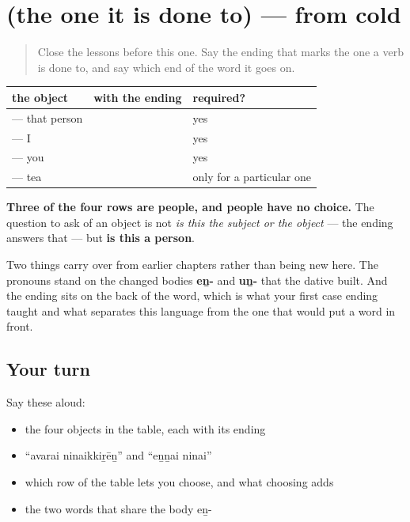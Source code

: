 \section[(the one it is done to)]{(the one it is done to) — from cold}

\label{lesson:TA-R86-ai-recall}



\begin{quote}
Close the lessons before this one. Say the ending that marks the one a verb is done to, and say which end of the word it goes on.
\end{quote}

\begin{grammarlens}[title={Grammar Lens: one ending, one question}]
\noindent
\begin{tabularx}{\linewidth}{@{}>{\raggedright\arraybackslash}X>{\raggedright\arraybackslash}X>{\raggedright\arraybackslash}X@{}}
\toprule
\textbf{the object} & \textbf{with the ending} & \textbf{required?} \\
\midrule
\ta{அவர்} — that person & \ta{அவரை} & yes \\
\ta{நான்} — I & \ta{என்னை} & yes \\
\ta{நீ} — you & \ta{உன்னை} & yes \\
\ta{தேநீர்} — tea & \ta{தேநீரை} & only for a particular one \\
\bottomrule
\end{tabularx}

\textbf{Three of the four rows are people, and people have no choice.} The question to ask of an object is not \emph{is this the subject or the object} — the ending answers that — but \textbf{is this a person}.

Two things carry over from earlier chapters rather than being new here. The pronouns stand on the changed bodies \textbf{eṉ-} and \textbf{uṉ-} that the dative built. And the ending sits on the back of the word, which is what your first case ending taught and what separates this language from the one that would put a word in front.
\end{grammarlens}

\subsection*{Your turn}
Say these aloud:

\begin{itemize}
\raggedright
  \item the four objects in the table, each with its ending
  \item \textquotedblleft{}avarai ninaikkiṟēṉ\textquotedblright{} and \textquotedblleft{}eṉṉai ninai\textquotedblright{}
  \item which row of the table lets you choose, and what choosing adds
  \item the two words that share the body eṉ-
\end{itemize}

